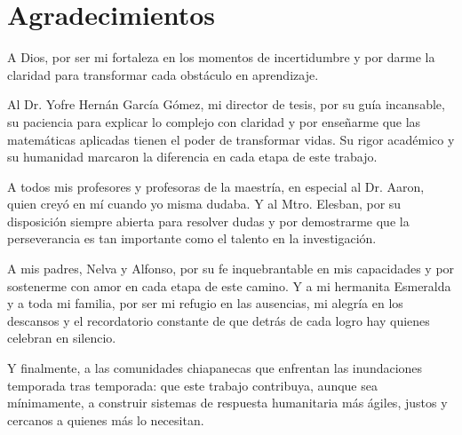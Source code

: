 \chapter*{Agradecimientos}

A Dios, por ser mi fortaleza en los momentos de incertidumbre y por darme la claridad para transformar cada obstáculo en aprendizaje.

Al Dr. Yofre Hernán García Gómez, mi director de tesis, por su guía incansable, su paciencia para explicar lo complejo con claridad y por enseñarme que las matemáticas aplicadas tienen el poder de transformar vidas. Su rigor académico y su humanidad marcaron la diferencia en cada etapa de este trabajo.

A todos mis profesores y profesoras de la maestría, en especial al Dr. Aaron, quien creyó en mí cuando yo misma dudaba. Y al Mtro. Elesban, por su disposición siempre abierta para resolver dudas y por demostrarme que la perseverancia es tan importante como el talento en la investigación.

A mis padres, Nelva y Alfonso, por su fe inquebrantable en mis capacidades y por sostenerme con amor en cada etapa de este camino. Y a mi hermanita Esmeralda y a toda mi familia, por ser mi refugio en las ausencias, mi alegría en los descansos y el recordatorio constante de que detrás de cada logro hay quienes celebran en silencio.

Y finalmente, a las comunidades chiapanecas que enfrentan las inundaciones temporada tras temporada: que este trabajo contribuya, aunque sea mínimamente, a construir sistemas de respuesta humanitaria más ágiles, justos y cercanos a quienes más lo necesitan.



